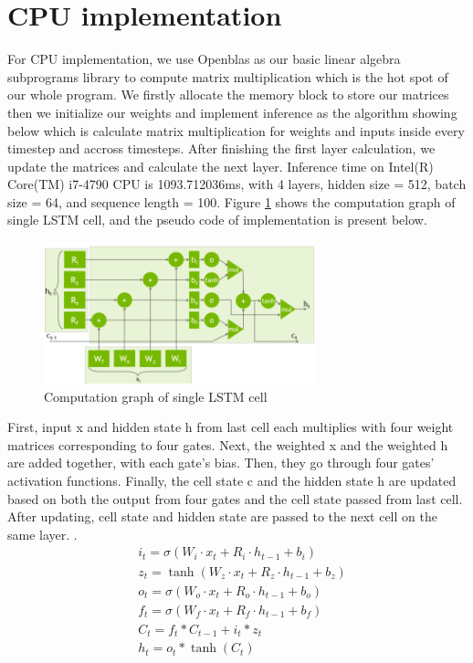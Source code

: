 \documentclass{article}
\begin{document}
\section{CPU implementation}
For CPU implementation, we use Openblas as our basic linear algebra subprograms library to compute matrix multiplication which is the hot spot of our whole program. We firstly allocate the memory block to store our matrices then we initialize our weights and implement inference as the algorithm showing below which is calculate matrix multiplication for weights and inputs inside every timestep and accross timesteps. After finishing the first layer calculation, we update the matrices and calculate the next layer. Inference time on Intel(R) Core(TM) i7-4790 CPU is 1093.712036ms, with 4 layers, hidden size = 512, batch size = 64, and sequence length = 100. Figure \ref{cell} shows the computation graph of single LSTM cell, and the pseudo code of implementation is present below.

\begin{figure}[H]
\centering
\includegraphics[width=0.7\textwidth]{graph.png}
\caption{Computation graph of single LSTM cell}
\label{cell}
\end{figure}

First, input x and hidden state h from last cell each multiplies with four weight matrices corresponding to four gates. Next, the weighted x and the weighted h are added together, with each gate's bias. Then, they go through four gates' activation functions. Finally, the cell state c and the hidden state h are updated based on both the output from four gates and the cell state passed from last cell.  After updating, cell state and hidden state are passed to the next cell on the same layer.
.
\begin{equation}
  \begin{split}
    & i_t=\sigma(W_i\cdot x_t + R_i\cdot h_{t-1} + b_i) \\
    & z_t=\tanh(W_z\cdot x_t + R_z\cdot h_{t-1} + b_z) \\
    & o_t=\sigma(W_o\cdot x_t + R_o\cdot h_{t-1} + b_o) \\
    & f_t=\sigma(W_f\cdot x_t + R_f\cdot h_{t-1} + b_f) \\
    & C_t=f_t * C_{t-1}+i_t * z_t \\
    & h_t=o_t * \tanh(C_t) \\
  \end{split}
\end{equation}
\end{document}
